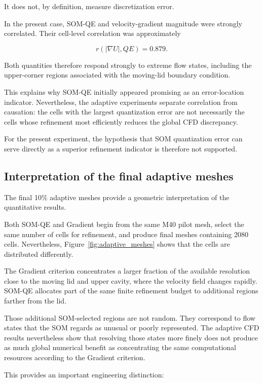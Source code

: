 It does not, by definition, measure discretization error.

In the present case, SOM-QE and velocity-gradient magnitude were strongly
correlated. Their cell-level correlation was approximately

\begin{equation}
r\left(|\nabla U|,QE\right)=0.879.
\end{equation}

Both quantities therefore respond strongly to extreme flow states, including
the upper-corner regions associated with the moving-lid boundary condition.

This explains why SOM-QE initially appeared promising as an error-location
indicator. Nevertheless, the adaptive experiments separate correlation from
causation: the cells with the largest quantization error are not necessarily
the cells whose refinement most efficiently reduces the global CFD
discrepancy.

For the present experiment, the hypothesis that SOM quantization error can
serve directly as a superior refinement indicator is therefore not
supported.

\subsection{Interpretation of the final adaptive meshes}

The final 10\% adaptive meshes provide a geometric interpretation of the
quantitative results.

Both SOM-QE and Gradient begin from the same M40 pilot mesh, select the same
number of cells for refinement, and produce final meshes containing 2080
cells. Nevertheless, Figure~\ref{fig:adaptive_meshes} shows that the cells
are distributed differently.

The Gradient criterion concentrates a larger fraction of the available
resolution close to the moving lid and upper cavity, where the velocity
field changes rapidly. SOM-QE allocates part of the same finite refinement
budget to additional regions farther from the lid.

Those additional SOM-selected regions are not random. They correspond to
flow states that the SOM regards as unusual or poorly represented.
The adaptive CFD results nevertheless show that resolving those states more
finely does not produce as much global numerical benefit as concentrating
the same computational resources according to the Gradient criterion.

This provides an important engineering distinction:


